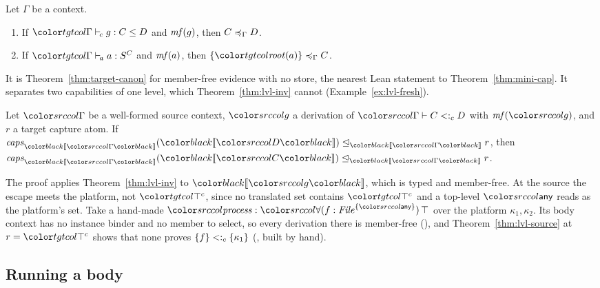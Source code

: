 \begin{theorem}\label{thm:root-inv}
Let $\Gamma$ be a context.
\begin{enumerate}
\item If $\clej{\Gamma}{g}{C}{D}$ and $\mathit{mf}(g)$, then $C \preccurlyeq_{\Gamma} D$.
\item If $\atomj{\Gamma}{a}{\capt{S}{C}}$ and $\mathit{mf}(a)$, then $\caple{\Gamma}{\cset{\rt{a}}}{C}$.
\end{enumerate}
\end{theorem}

It is Theorem~\ref{thm:target-canon} for member-free evidence with no store, the nearest Lean statement to Theorem~\ref{thm:mini-cap}. It separates two capabilities of one level, which Theorem~\ref{thm:lvl-inv} cannot (Example~\ref{ex:lvl-fresh}).

\begin{theorem}\label{thm:lvl-source}
Let $\src{\Gamma}$ be a well-formed source context, $\src{g}$ a derivation of $\subcj{\Gamma}{C}{D}$ with $\mfree{\src{g}}$, and $r$ a target capture atom. If $\lvlle{\trans{\Gamma}}{\capsr{\trans{\Gamma}}{}{\trans{D}}}{r}$, then $\lvlle{\trans{\Gamma}}{\capsr{\trans{\Gamma}}{}{\trans{C}}}{r}$.
\end{theorem}

The proof applies Theorem~\ref{thm:lvl-inv} to $\trans{g}$, which is typed and member-free. At the source the escape meets the platform, not $\topc$, since no translated set contains $\topc$ and a top-level $\cany$ reads as the platform's set. Take a hand-made $\src{\mathit{process} : \dall{f}{\capt{\mathit{File}}{\cset{\cany}}}{\top}}$ over the platform $\kappa_1, \kappa_2$. Its body context has no instance binder and no member to select, so every derivation there is member-free (), and Theorem~\ref{thm:lvl-source} at $r = \topc$ shows that none proves $\{f\} <:_c \{\kappa_1\}$ (, built by hand).

\subsection{Running a body}\label{sec:levels-run}

